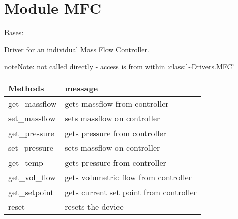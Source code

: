 \documentclass[letterpaper,10pt,english]{sphinxmanual}
\begin{document}
\section{Module MFC}
\label{\detokenize{source/laboratory.drivers:module-laboratory.drivers.mfc}}\label{\detokenize{source/laboratory.drivers:module-mfc}}

\begin{fulllineitems}
\label{\detokenize{source/laboratory.drivers:laboratory.drivers.mfc.AlicatController}}
Bases: 

Driver for an individual Mass Flow Controller.

\begin{sphinxadmonition}{note}{Note:}
not called directly - access is from within :class:’\textasciitilde{}Drivers.MFC’
\end{sphinxadmonition}


\begin{savenotes}\sphinxattablestart
\centering
\begin{tabulary}{\linewidth}[t]{|T|T|}
\hline
\sphinxstyletheadfamily 
Methods
&\sphinxstyletheadfamily 
message
\\
\hline
get\_massflow
&
gets massflow from controller
\\
\hline
set\_massflow
&
sets massflow on controller
\\
\hline
get\_pressure
&
gets pressure from controller
\\
\hline
set\_pressure
&
sets massflow on controller
\\
\hline
get\_temp
&
gets pressure from controller
\\
\hline
get\_vol\_flow
&
gets volumetric flow from controller
\\
\hline
get\_setpoint
&
gets current set point from controller
\\
\hline
reset
&
resets the device
\\
\hline
\end{tabulary}
\par
\sphinxattableend\end{savenotes}


\end{fulllineitems}
\end{document}
